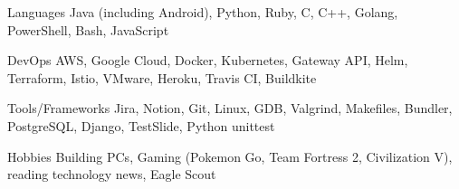 

\begin{cvskills}


  \cvskill
    {Languages} %
    {Java (including Android), Python, Ruby, C, C++, Golang, PowerShell, Bash, JavaScript} %

  \cvskill
    {DevOps} %
    {AWS, Google Cloud, Docker, Kubernetes, Gateway API, Helm, Terraform, Istio, VMware, Heroku, Travis CI, Buildkite} %
    
  \cvskill
    {Tools/Frameworks} %
    {Jira, Notion, Git, Linux, GDB, Valgrind, Makefiles, Bundler, PostgreSQL, Django, TestSlide, Python unittest} %

  \cvskill
  {Hobbies} %
  {Building PCs, Gaming (Pokemon Go, Team Fortress 2, Civilization V), reading technology news, Eagle Scout} %

\end{cvskills}
